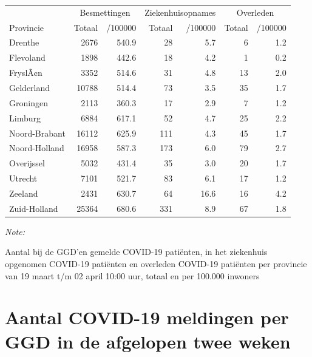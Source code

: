 \documentclass[
  english,
  man,floatsintext]{apa6}
\begin{document}
\begin{table}
\centering
\begin{threeparttable}
\begin{tabular}{lrrrrrr}
\toprule
\multicolumn{1}{c}{ } & \multicolumn{2}{c}{Besmettingen} & \multicolumn{2}{c}{Ziekenhuisopnames} & \multicolumn{2}{c}{Overleden} \\
\cmidrule(l{3pt}r{3pt}){2-3} \cmidrule(l{3pt}r{3pt}){4-5} \cmidrule(l{3pt}r{3pt}){6-7}
Provincie & Totaal & /100000 & Totaal & /100000 & Totaal & /100000\\
\midrule
Drenthe & 2676 & 540.9 & 28 & 5.7 & 6 & 1.2\\
Flevoland & 1898 & 442.6 & 18 & 4.2 & 1 & 0.2\\
FryslÃ¢n & 3352 & 514.6 & 31 & 4.8 & 13 & 2.0\\
Gelderland & 10788 & 514.4 & 73 & 3.5 & 35 & 1.7\\
Groningen & 2113 & 360.3 & 17 & 2.9 & 7 & 1.2\\
Limburg & 6884 & 617.1 & 52 & 4.7 & 25 & 2.2\\
Noord-Brabant & 16112 & 625.9 & 111 & 4.3 & 45 & 1.7\\
Noord-Holland & 16958 & 587.3 & 173 & 6.0 & 79 & 2.7\\
Overijssel & 5032 & 431.4 & 35 & 3.0 & 20 & 1.7\\
Utrecht & 7101 & 521.7 & 83 & 6.1 & 17 & 1.2\\
Zeeland & 2431 & 630.7 & 64 & 16.6 & 16 & 4.2\\
Zuid-Holland & 25364 & 680.6 & 331 & 8.9 & 67 & 1.8\\
\bottomrule
\end{tabular}
\begin{tablenotes}
\item \textit{Note: } 
\item Aantal bij de GGD’en gemelde COVID-19 patiënten, in het ziekenhuis opgenomen COVID-19 patiënten en overleden COVID-19 patiënten per provincie van 19 maart t/m 02 april 10:00 uur, totaal en per 100.000 inwoners
\end{tablenotes}
\end{threeparttable}
\end{table}

\newpage

\hypertarget{aantal-covid-19-meldingen-per-ggd-in-de-afgelopen-twee-weken}{%
\section{Aantal COVID-19 meldingen per GGD in de afgelopen twee weken}\label{aantal-covid-19-meldingen-per-ggd-in-de-afgelopen-twee-weken}}
\end{document}
